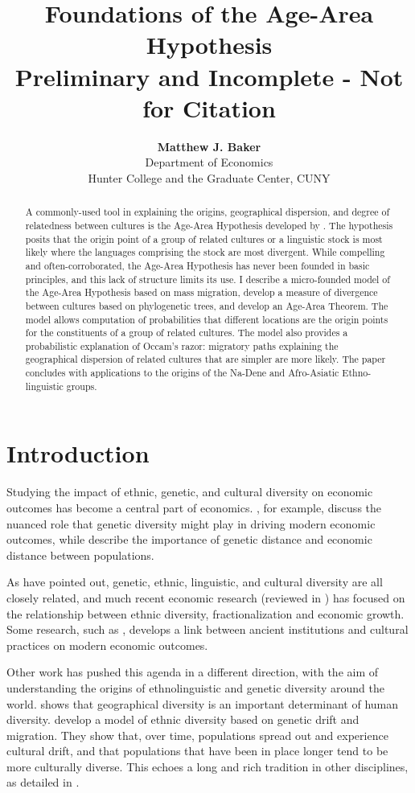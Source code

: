 \documentclass[11pt]{article}
\title{Foundations of the Age-Area Hypothesis \\ \large{Preliminary and Incomplete - Not for Citation}}
\author{\textbf{Matthew J. Baker} \\ Department of Economics \\ Hunter College and the Graduate Center, CUNY}
\begin{document}
\maketitle
\begin{abstract}
\noindent A commonly-used tool in explaining the origins, geographical dispersion, and degree of relatedness between cultures is the Age-Area Hypothesis developed by \cite{sapir16}. The hypothesis posits that the origin point of a group of related cultures or a linguistic stock is most likely where the languages comprising the stock are most divergent. While compelling and often-corroborated, the Age-Area Hypothesis has never been founded in basic principles, and this lack of structure limits its use. I describe a micro-founded model of the Age-Area Hypothesis based on mass migration, develop a measure of divergence between cultures based on phylogenetic trees, and develop an Age-Area Theorem. The model allows computation of probabilities that different locations are the origin points for the constituents of a group of related cultures. The model also provides a probabilistic explanation of Occam's razor: migratory paths explaining the geographical dispersion of related cultures that are simpler are  more likely. The paper concludes with applications to the origins of the Na-Dene and Afro-Asiatic Ethno-linguistic groups. 
\end{abstract}
\newpage

\section{Introduction}
Studying the impact of ethnic, genetic, and cultural diversity on economic outcomes has become a central part of economics. \cite{ashraf13}, for example, discuss the nuanced role that genetic diversity might play in driving modern economic outcomes, while \cite{spolaore09} describe the importance of genetic distance and economic distance between populations. 

As \cite{cavalli95} have pointed out, genetic, ethnic, linguistic, and cultural diversity are all closely related, and much recent economic research (reviewed in \cite{alesina05}) has focused on the relationship between ethnic diversity, fractionalization and economic growth. Some research, such as \cite{spolaore13}, develops a link between ancient institutions and cultural practices on modern economic outcomes. 

Other work has pushed this agenda in a different direction, with the aim of understanding the origins of ethnolinguistic and genetic diversity around the world.   \cite{michalopoulos12} shows that geographical diversity is an important determinant of human diversity.  \cite{ahlerup12} develop a model of ethnic diversity based on genetic drift and migration. They show that, over time, populations spread out and experience cultural drift, and that populations that have been in place longer tend to be more culturally diverse. This echoes a long and rich tradition in other disciplines, as detailed in  \cite{mace05}. 
\end{document}
